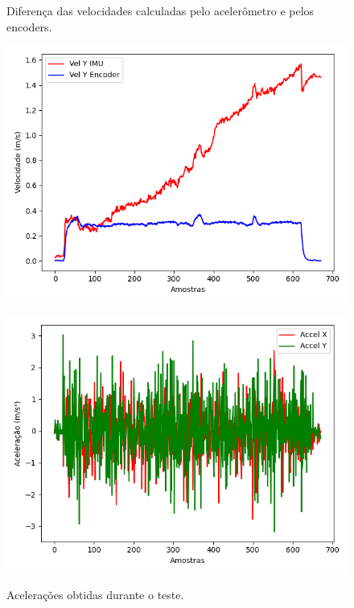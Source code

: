 \documentclass[acronym, symbols, table, deposito]{fei}
\begin{document}
			\begin{figure}
				\centering
				\begin{minipage}[t]{0.47\textwidth}
					\centering
					\caption{Diferença das velocidades calculadas pelo acelerômetro e pelos encoders.}
					\includegraphics[width=\textwidth]{comparacao_velocidade_accel_encoder.png}
					\label{fig:comparacao_velocidade_accel_encoder}
				\end{minipage}
				\hspace{1em}
				\begin{minipage}[t]{0.47\textwidth}
					\centering
					\caption{Acelerações obtidas durante o teste.}
					\includegraphics[width=\textwidth]{dados_acelerometro_x_y.png}
					\label{fig:comparacao_acelerometro_x_y}
				\end{minipage}
			\end{figure}
			
\end{document}
